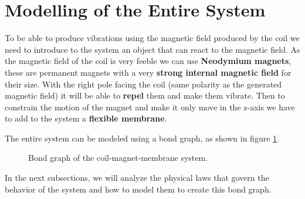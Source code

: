 \section{Modelling of the Entire System}
To be able to produce vibrations using the magnetic field produced by the coil we need to introduce to the system an object that can react to the magnetic field. As the magnetic field of the coil is very feeble we can use \textbf{Neodymium magnets}, these are permanent magnets with a very \textbf{strong internal magnetic field} for their size.
With the right pole facing the coil (same polarity as the generated magnetic field) it will be able to \textbf{repel} them and make them vibrate.
Then to constrain the motion of the magnet and make it only move in the z-axis we have to add to the system a \textbf{flexible membrane}.

\begin{samepage}
    The entire system can be modeled using a bond graph, as shown in figure \ref{fig: Total_bond-graph}.
    \nopagebreak

    \begin{figure}[H]
        \centering
        \resizebox{.9\linewidth}{!}{} %
        \caption{Bond graph of the coil-magnet-membrane system.}
        \label{fig: Total_bond-graph}
    \end{figure}
\end{samepage}

In the next subsections, we will analyze the physical laws that govern the behavior of the system and how to model them to create this bond graph.







